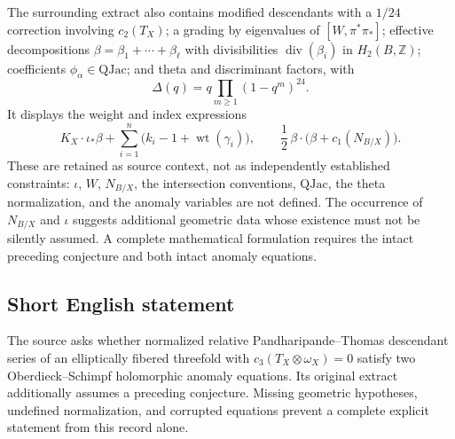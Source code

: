 \documentclass[11pt]{article}
\newcommand{\Z}{\mathbb{Z}}
\begin{document}
The surrounding extract also contains modified descendants with a \(1/24\) correction involving \(c_2(T_X)\); a grading by eigenvalues of \([W,\pi^*\pi_*]\); effective decompositions \(\beta=\beta_1+\cdots+\beta_\ell\) with divisibilities \(\operatorname{div}(\beta_i)\) in \(H_2(B,\Z)\); coefficients \(\phi_\alpha\in\mathrm{QJac}\); and theta and discriminant factors, with
\[
 \Delta(q)=q\prod_{m\geq1}(1-q^m)^{24}.
\]
It displays the weight and index expressions
\[
 K_X\cdot\iota_*\beta+
 \sum_{i=1}^{n}\bigl(k_i-1+\operatorname{wt}(\gamma_i)\bigr),
 \qquad
 \frac12\,\beta\cdot\bigl(\beta+c_1(N_{B/X})\bigr).
\]
These are retained as source context, not as independently established constraints: \(\iota\), \(W\), \(N_{B/X}\), the intersection conventions, \(\mathrm{QJac}\), the theta normalization, and the anomaly variables are not defined. The occurrence of \(N_{B/X}\) and \(\iota\) suggests additional geometric data whose existence must not be silently assumed. A complete mathematical formulation requires the intact preceding conjecture and both intact anomaly equations.
\subsection{Short English statement}
The source asks whether normalized relative Pandharipande--Thomas descendant series of an elliptically fibered threefold with \(c_3(T_X\otimes\omega_X)=0\) satisfy two Oberdieck--Schimpf holomorphic anomaly equations. Its original extract additionally assumes a preceding conjecture. Missing geometric hypotheses, undefined normalization, and corrupted equations prevent a complete explicit statement from this record alone.
\end{document}
